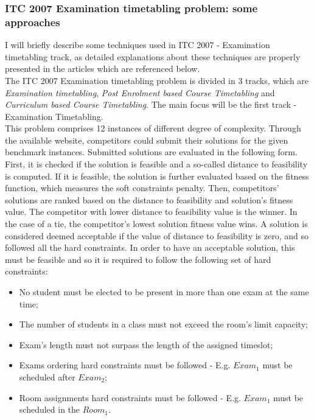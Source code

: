 \subsubsection{ITC 2007 Examination timetabling problem: some approaches}
\label{subsection:ApprITC2007}

I will briefly describe some techniques used in ITC 2007 - Examination timetabling track, as detailed explanations about these techniques are properly presented in the articles which are referenced below.
\\
The ITC 2007 Examination timetabling problem is divided in 3 tracks, which are \textit{Examination timetabling}, \textit{Post Enrolment based Course Timetabling} and \textit{Curriculum based Course Timetabling}. The main focus will be the first track - Examination Timetabling.
\\
This problem comprises 12 instances of different degree of complexity. Through the available website, competitors could submit  their solutions for the given benchmark instances. Submitted solutions are evaluated in the following form. First, it is checked if the solution is feasible and a so-called distance to feasibility is computed. If it is feasible, the solution is further evaluated based on the fitness function, which measures the soft constraints penalty. Then, competitors' solutions are ranked based on the distance to feasibility and solution's fitness value. The competitor with lower distance to feasibility value is the winner. In the case of a tie, the competitor's lowest solution fitness value wins. A solution is considered deemed acceptable if the value of distance to feasibility is zero, and so followed all the hard constraints. In order to have an acceptable solution, this must be feasible and so it is required to follow the following set of hard constraints:
\begin{itemize}
	\item No student must be elected to be present in more than one exam at the same time;
	\item The number of students in a class must not exceed the room's limit capacity;
	\item Exam's length must not surpass the length of the assigned timeslot;
	\item Exams ordering hard constraints must be followed - E.g. $Exam_1$ must be scheduled after $Exam_2$;
	\item Room assignments hard constraints must be followed - E.g. 	$Exam_1$ must be scheduled in the $Room_1$.
\end{itemize}

